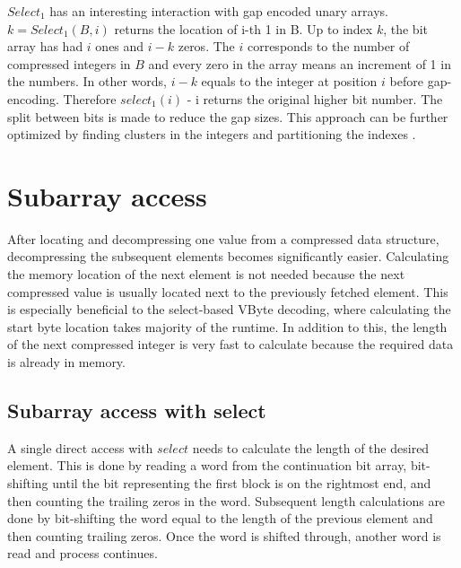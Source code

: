$Select_1$ has an interesting interaction with gap encoded unary arrays. $k = Select_1(B,i)$ 
returns the location of i-th 1 in B. Up to index $k$, the bit array has had $i$ ones and $i-k$ zeros. The $i$ corresponds to the number of compressed integers in $B$ and every zero in the array 
means an increment of 1 in the numbers. In other words, $i-k$ equals to the integer at position $i$ before gap-encoding. Therefore $select_1(i)$ - i returns the original higher bit number. The split 
between bits is made to reduce the gap sizes.
This approach can be further optimized by finding clusters in the integers and partitioning the indexes \citep{Ott14}.

\chapter{Subarray access}

After locating and decompressing one value from a compressed data structure, decompressing the subsequent elements becomes significantly easier. Calculating the memory location of the next element is not 
needed because the next compressed value is usually located next to the previously fetched element. This is especially beneficial to the select-based VByte decoding, where calculating the start 
byte location takes majority of the runtime. In addition to this, the length of the next compressed integer is very fast to calculate because the required data is already in memory.

\section{Subarray access with select}
A single direct access with $select$ needs to calculate the length of the desired element. This is done by reading a word from the continuation bit array, bit-shifting until the bit representing 
the first block is on the rightmost end, and then counting the trailing zeros in the word. Subsequent length calculations are done by bit-shifting the word equal to the length of the previous element 
and then counting trailing zeros. Once the word is shifted through, another word is read and process continues.

